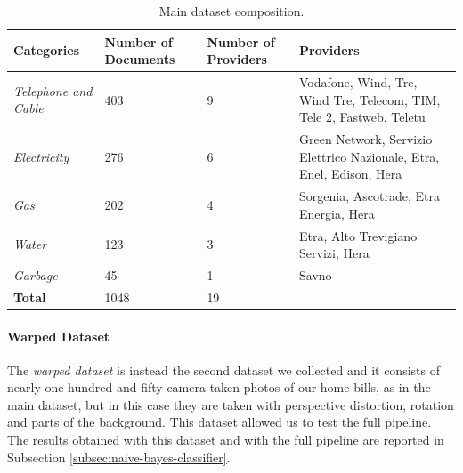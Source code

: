 \documentclass[10pt,twocolumn,letterpaper]{article}
\begin{document}
\bgroup
\def\arraystretch{1.5}%
\begin{table}[!h]
  \begin{center}
    \begin{tabular}{p{1.5cm} p{1.2cm} p{1.2cm} p{3cm}}
      \hline
      Categories                 & Number of Documents & Number of Providers & Providers                                                             \\ \hline
      \emph{Telephone and Cable} & 403                 & 9                   & Vodafone, Wind, Tre, Wind Tre, Telecom, TIM, Tele 2, Fastweb, Teletu  \\
      \emph{Electricity}         & 276                 & 6                   & Green Network, Servizio Elettrico Nazionale, Etra, Enel, Edison, Hera \\
      \emph{Gas}                 & 202                 & 4                   & Sorgenia, Ascotrade, Etra Energia, Hera                               \\
      \emph{Water}               & 123                 & 3                   & Etra, Alto Trevigiano Servizi, Hera                                   \\
      \emph{Garbage}             & 45                  & 1                   & Savno                                                                 \\ \hline
      \textbf{Total}             & 1048                & 19                  &                                                                       \\ \hline
    \end{tabular}
  \end{center}
  \label{table:main-dataset}
  \caption{Main dataset composition.}
\end{table}
\egroup

\paragraph{Warped Dataset}
\label{par:warped-dataset}

The \emph{warped dataset} is instead the second dataset we collected and it 
consists of nearly one hundred and fifty camera taken photos of our
home bills, as in the main dataset, but in this case they are taken
with perspective distortion, rotation and parts of the
background. This dataset allowed us to test the full
pipeline. The results obtained with this dataset and with the full
pipeline are reported in Subsection \ref{subsec:naive-bayes-classifier}.
\end{document}

